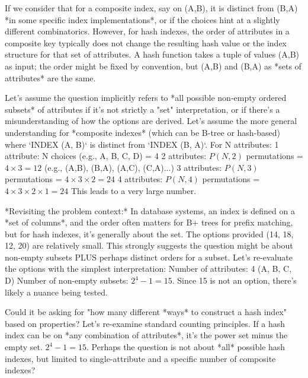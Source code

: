 \documentclass{article}
\begin{document}
\begin{enumerate}[label=\textbf{Question \arabic*.}]
\begin{itemize}
            If we consider that for a composite index, say on (A,B), it is distinct from (B,A) *in some specific index implementations*, or if the choices hint at a slightly different combinatorics. However, for hash indexes, the order of attributes in a composite key typically does not change the resulting hash value or the index structure for that set of attributes. A hash function takes a tuple of values (A,B) as input; the order might be fixed by convention, but (A,B) and (B,A) as *sets of attributes* are the same.
    
            Let's assume the question implicitly refers to *all possible non-empty ordered subsets* of attributes if it's not strictly a "set" interpretation, or if there's a misunderstanding of how the options are derived.
            Let's assume the more general understanding for *composite indexes* (which can be B-tree or hash-based) where `INDEX (A, B)` is distinct from `INDEX (B, A)`.
            For N attributes:
            1 attribute: N choices (e.g., A, B, C, D) = 4
            2 attributes: $P(N,2)$ permutations = $4 \times 3 = 12$ (e.g., (A,B), (B,A), (A,C), (C,A)...)
            3 attributes: $P(N,3)$ permutations = $4 \times 3 \times 2 = 24$
            4 attributes: $P(N,4)$ permutations = $4 \times 3 \times 2 \times 1 = 24$
            This leads to a very large number.
    
            *Revisiting the problem context:* In database systems, an index is defined on a *set of columns*, and the order often matters for B+ trees for prefix matching, but for hash indexes, it's generally about the set. The options provided (14, 18, 12, 20) are relatively small. This strongly suggests the question might be about non-empty subsets PLUS perhaps distinct orders for a subset.
            Let's re-evaluate the options with the simplest interpretation:
            Number of attributes: 4 (A, B, C, D)
            Number of non-empty subsets: $2^4 - 1 = 15$.
            Since 15 is not an option, there's likely a nuance being tested.
    
            Could it be asking for "how many different *ways* to construct a hash index" based on properties?
            Let's re-examine standard counting principles.
            If a hash index can be on *any combination of attributes*, it's the power set minus the empty set. $2^4 - 1 = 15$.
            Perhaps the question is not about *all* possible hash indexes, but limited to single-attribute and a specific number of composite indexes?
    

\end{itemize}
\end{enumerate}
\end{document}
